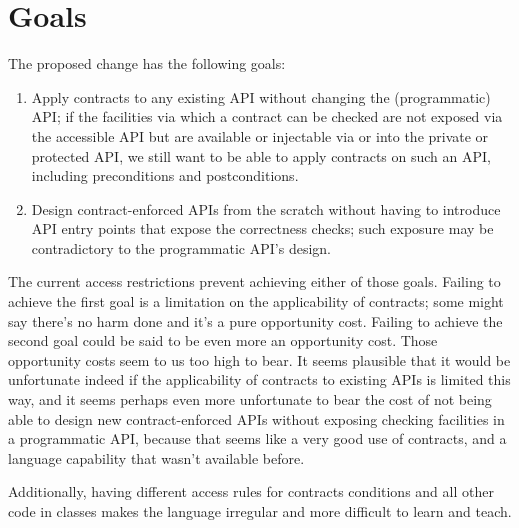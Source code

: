 \section{Goals}

The proposed change has the following goals:

\begin{enumerate}

\item
Apply contracts to any existing API without changing the (programmatic) API; if
the facilities via which a contract can be checked are not exposed via the
accessible API but are available or injectable via or into the private or
protected API, we still want to be able to apply contracts on such an API,
including preconditions and postconditions.

\item
Design contract-enforced APIs from the scratch without having to introduce API
entry points that expose the correctness checks; such exposure may be
contradictory to the programmatic API's design.

\end{enumerate}

The current access restrictions prevent achieving either of those goals.
Failing to achieve the first goal is a limitation on the applicability of
contracts; some might say there's no harm done and it's a pure opportunity
cost. Failing to achieve the second goal could be said to be even more an
opportunity cost. Those opportunity costs seem to us too high to bear. It seems
plausible that it would be unfortunate indeed if the applicability of contracts
to existing APIs is limited this way, and it seems perhaps even more
unfortunate to bear the cost of not being able to design new contract-enforced
APIs without exposing checking facilities in a programmatic API, because that
seems like a very good use of contracts, and a language capability that wasn't
available before.

Additionally, having different access rules for contracts conditions and all
other code in classes makes the language irregular and more difficult to learn
and teach.
